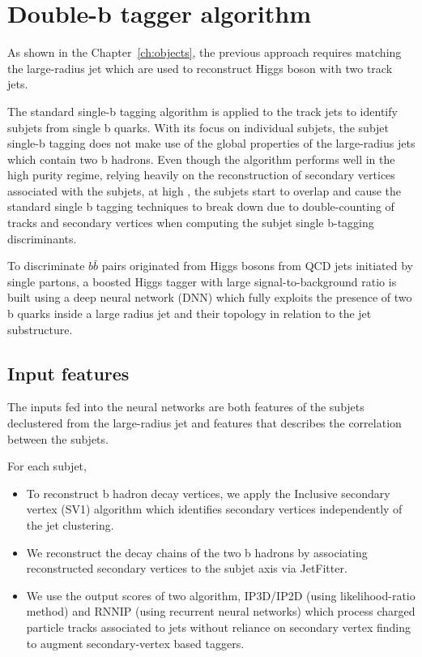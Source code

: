 \section{Double-b tagger algorithm}
\label{sec:algo}

\par As shown in the Chapter~\ref{ch:objects}, the previous approach requires matching the large-radius jet which are used to reconstruct Higgs boson with two track jets.
\par The standard single-b tagging algorithm is applied to the track jets to identify subjets from single b quarks. With its focus on individual subjets, the subjet single-b tagging does not make use of the global properties of the large-radius jets which contain two b hadrons. Even though the algorithm performs well in the high purity regime, relying heavily on the reconstruction of secondary vertices associated with the subjets, at high \pt, the subjets start to overlap and cause the standard single b tagging techniques to break down due to double-counting of tracks and secondary vertices when computing the subjet single b-tagging discriminants. 
\par To discriminate $b\bar{b}$ pairs originated from Higgs bosons from QCD jets initiated by single partons, a boosted Higgs tagger with large signal-to-background ratio is built using a deep neural network (DNN) which fully exploits the presence of two b quarks inside a large radius jet and their topology in relation to the jet substructure. 

\subsection{Input features}

\par The inputs fed into the neural networks are both features of the subjets declustered from the large-radius jet and features that describes the correlation between the subjets.
\par For each subjet,
\begin{itemize}
    \item To reconstruct b hadron decay vertices, we apply the Inclusive secondary vertex (SV1) algorithm which identifies secondary vertices independently of the jet clustering.
    \item We reconstruct the decay chains of the two b hadrons by associating reconstructed secondary vertices to the subjet axis via JetFitter.
    \item We use the output scores of two algorithm, IP3D/IP2D (using likelihood-ratio method) and RNNIP (using recurrent neural networks) which process charged particle tracks associated to jets without reliance on secondary 
    vertex finding to augment secondary-vertex based taggers. 
\end{itemize}

